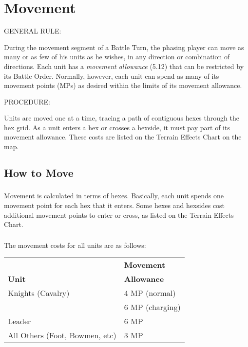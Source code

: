 \section{Movement}

GENERAL RULE:

During the movement segment of a Battle Turn, the phasing player can move as many or as few of his units as he wishes, in any direction or combination of directions. Each unit has a \textit{movement allowance} (5.12) that can be restricted by its Battle Order. Normally, however, each unit can spend as many of its movement points (MPs) as desired within the limits of its movement allowance.

PROCEDURE:

Units are moved one at a time, tracing a path of contiguous hexes through the hex grid. As a unit enters a hex or crosses a hexside, it must pay part of its movement allowance. These costs are listed on the Terrain Effects Chart on the map.

\subsection{How to Move}

\subsubsection[Movement Calculation]{} Movement is calculated in terms of hexes. Basically, each unit spends one movement point for each hex that it enters. Some hexes and hexsides cost additional movement points to enter or cross, as listed on the Terrain Effects Chart.

\subsubsection[Movement Costs]{} The movement costs for all units are as follows:

\begin{tabular}{ |l|l| }
  \hline
  & \textbf{Movement} \\
  \textbf{Unit} & \textbf{Allowance} \\
  \hline
  Knights (Cavalry) & 4 MP (normal) \\
  & 6 MP (charging) \\
  Leader & 6 MP \\
  All Others (Foot, Bowmen, etc) & 3 MP \\
  \hline
\end{tabular}

